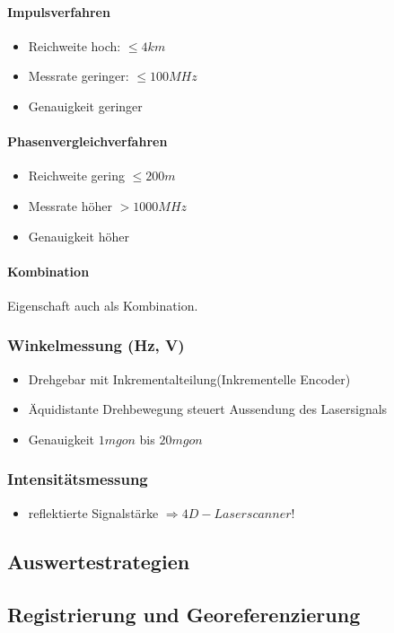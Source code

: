 \documentclass[12pt]{article}
\begin{document}
\paragraph{Impulsverfahren}
\begin{itemize}
	\item Reichweite hoch: $\leq 4km$
	\item Messrate geringer: $\leq 100 MHz$
	\item Genauigkeit geringer
\end{itemize}
\paragraph{Phasenvergleichverfahren}
\begin{itemize}
	\item Reichweite gering $\leq 200 m$
	\item Messrate höher $> 1000MHz$
	\item Genauigkeit höher
\end{itemize}
\paragraph{Kombination}
Eigenschaft auch als Kombination.
\subsubsection{Winkelmessung (Hz, V)}
\begin{itemize}
	\item Drehgebar mit Inkrementalteilung(Inkrementelle Encoder)
	\item Äquidistante Drehbewegung steuert Aussendung des Lasersignals
	\item Genauigkeit $1mgon$ bis $20mgon$
\end{itemize}
\subsubsection{Intensitätsmessung}
\begin{itemize}
	\item reflektierte Signalstärke $\Rightarrow 4D-Laserscanner$!
\end{itemize}
\subsection{Auswertestrategien}
\subsection{Registrierung und Georeferenzierung}
\end{document}
